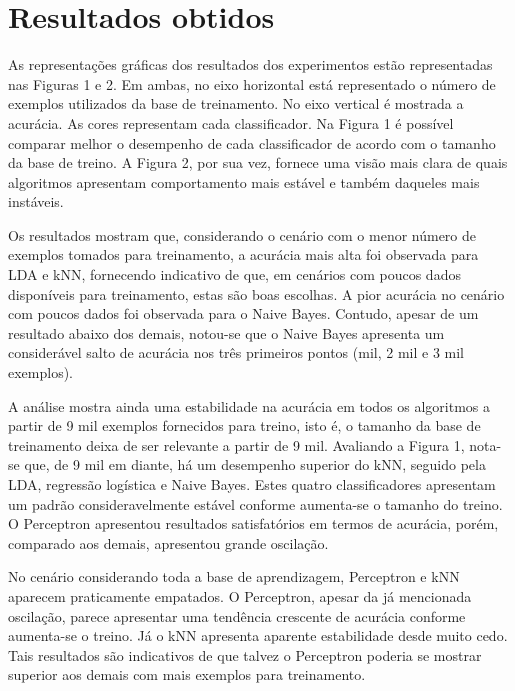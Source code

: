 \documentclass[
	12pt,				%
	openright,			%
	twoside,			%
	a4paper,			%
	english,			%
	brazil,				%
	svgnames
	]{abntex2}\usepackage[]{graphicx}\usepackage[]{color}
\begin{document}
\chapter{Resultados obtidos}
\label{cap:resultados}


As representações gráficas dos resultados dos experimentos estão representadas nas Figuras 1 e 2. Em ambas, no eixo horizontal está representado o número de exemplos utilizados da base de treinamento. No eixo vertical é mostrada a acurácia. As cores representam cada classificador. Na Figura 1 é possível comparar melhor o desempenho de cada classificador de acordo com o tamanho da base de treino. A Figura 2, por sua vez, fornece uma visão mais clara de quais algoritmos apresentam comportamento mais estável e também daqueles mais instáveis.

Os resultados mostram que, considerando o cenário com o menor número de exemplos tomados para treinamento, a acurácia mais alta foi observada para LDA e kNN, fornecendo indicativo de que, em cenários com poucos dados disponíveis para treinamento, estas são boas escolhas. A pior acurácia no cenário com poucos dados foi observada para o Naive Bayes. Contudo, apesar de um resultado abaixo dos demais, notou-se que o Naive Bayes apresenta um considerável salto de acurácia nos três primeiros pontos (mil, 2 mil e 3 mil exemplos). 

A análise mostra ainda uma estabilidade na acurácia em todos os algoritmos a partir de 9 mil exemplos fornecidos para treino, isto é, o tamanho da base de treinamento deixa de ser relevante a partir de 9 mil. Avaliando a Figura 1, nota-se que, de 9 mil em diante, há um desempenho superior do kNN, seguido pela LDA, regressão logística e Naive Bayes. Estes quatro classificadores apresentam um padrão consideravelmente estável conforme aumenta-se o tamanho do treino. O Perceptron apresentou resultados satisfatórios em termos de acurácia, porém, comparado aos demais, apresentou grande oscilação. 

No cenário considerando toda a base de aprendizagem, Perceptron e kNN aparecem praticamente empatados. O Perceptron, apesar da já mencionada oscilação, parece apresentar uma tendência crescente de acurácia conforme aumenta-se o treino. Já o kNN apresenta aparente estabilidade desde muito cedo. Tais resultados são indicativos de que talvez o Perceptron poderia se mostrar superior aos demais com mais exemplos para treinamento.
\end{document}
